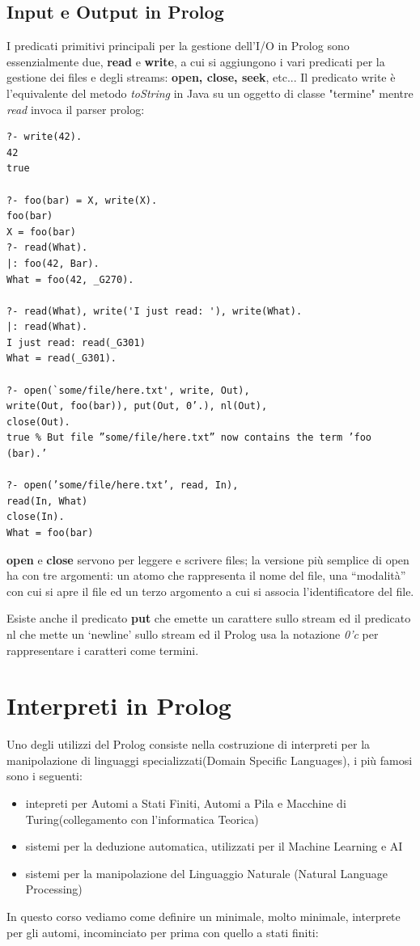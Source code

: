 \documentclass[a4paper]{book}
\begin{document}
\subsection{Input e Output in Prolog}
I predicati primitivi principali per la gestione dell'I/O in Prolog sono essenzialmente due, \textbf{read} e \textbf{write},
a cui si aggiungono i vari predicati per la gestione dei files e degli streams: \textbf{open, close, seek}, etc...
Il predicato write è l'equivalente del metodo \emph{toString} in Java su un oggetto di classe "termine" mentre \emph{read} invoca il parser prolog:
\begin{shaded}
\begin{verbatim}
?- write(42).
42
true

?- foo(bar) = X, write(X).
foo(bar)
X = foo(bar)
?- read(What).
|: foo(42, Bar).
What = foo(42, _G270).

?- read(What), write('I just read: '), write(What).
|: read(What).
I just read: read(_G301)
What = read(_G301).

?- open(`some/file/here.txt', write, Out),
write(Out, foo(bar)), put(Out, 0’.), nl(Out),
close(Out).
true % But file ”some/file/here.txt” now contains the term ’foo
(bar).’

?- open(’some/file/here.txt’, read, In),
read(In, What)
close(In).
What = foo(bar)
\end{verbatim}
\end{shaded}
\textbf{open} e \textbf{close} servono per leggere e scrivere files; la versione più semplice di open ha con tre argomenti:
un atomo che rappresenta il nome del file, una “modalità” con cui si apre il file ed un terzo argomento a cui si associa l’identificatore del file.

Esiste anche il predicato \textbf{put} che emette un carattere sullo stream ed il predicato nl che mette un ‘newline’ sullo stream
ed il Prolog usa la notazione \textit{0'c} per rappresentare i caratteri come termini.
\section{Interpreti in Prolog}
Uno degli utilizzi del Prolog consiste nella costruzione di interpreti per la manipolazione di linguaggi specializzati(Domain Specific Languages),
i più famosi sono i seguenti:
\begin{itemize}
\item intepreti per Automi a Stati Finiti, Automi a Pila e  Macchine di Turing(collegamento con l'informatica Teorica)
\item sistemi per la deduzione automatica, utilizzati per il Machine Learning e AI
\item sistemi per la manipolazione del Linguaggio Naturale (Natural Language Processing)
\end{itemize}
In questo corso vediamo come definire un minimale, molto minimale, interprete per gli automi, incominciato per prima con quello a stati finiti:
\end{document}

